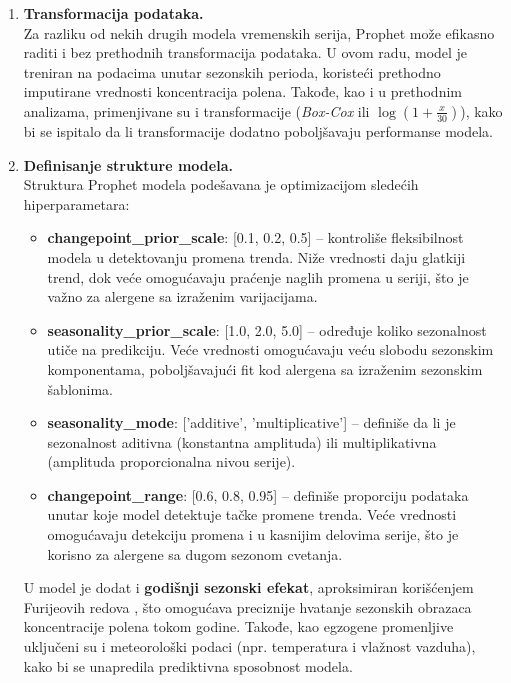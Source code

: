 \documentclass[12pt]{article}
\begin{document}
\begin{enumerate}
    \item \textbf{Transformacija podataka.} \\
    Za razliku od nekih drugih modela vremenskih serija, Prophet može efikasno raditi i bez prethodnih transformacija podataka. U ovom radu, model je treniran na podacima unutar sezonskih perioda, koristeći prethodno imputirane vrednosti koncentracija polena. Takođe, kao i u prethodnim analizama, primenjivane su i transformacije (\textit{Box-Cox} ili $\log(1 + \frac{x}{30})$), kako bi se ispitalo da li transformacije dodatno poboljšavaju performanse modela.

    \item \textbf{Definisanje strukture modela.} \\
    Struktura Prophet modela podešavana je optimizacijom sledećih hiperparametara:
    \begin{itemize}
        \item \textbf{changepoint\_prior\_scale}: [0.1, 0.2, 0.5] – kontroliše fleksibilnost modela u detektovanju promena trenda. Niže vrednosti daju glatkiji trend, dok veće omogućavaju praćenje naglih promena u seriji, što je važno za alergene sa izraženim varijacijama.
        \item \textbf{seasonality\_prior\_scale}: [1.0, 2.0, 5.0] – određuje koliko sezonalnost utiče na predikciju. Veće vrednosti omogućavaju veću slobodu sezonskim komponentama, poboljšavajući fit kod alergena sa izraženim sezonskim šablonima.
        \item \textbf{seasonality\_mode}: ['additive', 'multiplicative'] – definiše da li je sezonalnost aditivna (konstantna amplituda) ili multiplikativna (amplituda proporcionalna nivou serije).
        \item \textbf{changepoint\_range}: [0.6, 0.8, 0.95] – definiše proporciju podataka unutar koje model detektuje tačke promene trenda. Veće vrednosti omogućavaju detekciju promena i u kasnijim delovima serije, što je korisno za alergene sa dugom sezonom cvetanja.
    \end{itemize}

    U model je dodat i \textbf{godišnji sezonski efekat}, aproksimiran korišćenjem Furijeovih redova \cite{hyndman2018forecasting}, što omogućava preciznije hvatanje sezonskih obrazaca koncentracije polena tokom godine. Takođe, kao egzogene promenljive uključeni su i meteorološki podaci (npr. temperatura i vlažnost vazduha), kako bi se unapredila prediktivna sposobnost modela.


\end{enumerate}
\end{document}
